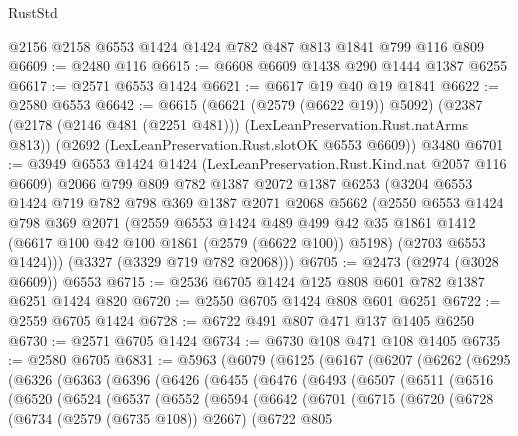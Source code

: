 \begin{lexlean}{RustStd}
\begin{coremodule}
{\begin{coremodule}
{{{{{{{{{{    @2156
    @2158
    @6553
    @1424
    @1424
    @782
    @487
    @813
    @1841
    @799
    @116
    @809
@6609 := @2480 @116
@6615 := @6608 @6609 @1438 @290 @1444 @1387 @6255
@6617 := @2571 @6553 @1424
@6621 := @6617 @19 @40 @19 @1841
@6622 := @2580 @6553
@6642 := @6615
    (@6621 (@2579 (@6622 @19)) @5092)
    (@2387 (@2178 (@2146 @481 (@2251 @481))) (LexLeanPreservation.Rust.natArms @813))
    (@2692 (LexLeanPreservation.Rust.slotOK @6553 @6609))
    @3480
@6701 := @3949
    @6553
    @1424
    @1424
    (LexLeanPreservation.Rust.Kind.nat @2057 @116 @6609)
    @2066
    @799
    @809
    @782
    @1387
    @2072
    @1387
    @6253
    (@3204
      @6553
      @1424
      @719
      @782
      @798
      @369
      @1387
      @2071
      @2068
      @5662
      (@2550
        @6553
        @1424
        @798
        @369
        @2071
        (@2559
          @6553
          @1424
          @489
          @499
          @42
          @35
          @1861
          @1412
          (@6617 @100 @42 @100 @1861 (@2579 (@6622 @100)) @5198)
          (@2703 @6553 @1424)))
      (@3327 (@3329 @719 @782 @2068)))
@6705 := @2473 (@2974 (@3028 @6609)) @6553
@6715 := @2536 @6705 @1424 @125 @808 @601 @782 @1387 @6251 @1424 @820
@6720 := @2550 @6705 @1424 @808 @601 @6251
@6722 := @2559 @6705 @1424
@6728 := @6722 @491 @807 @471 @137 @1405 @6250
@6730 := @2571 @6705 @1424
@6734 := @6730 @108 @471 @108 @1405
@6735 := @2580 @6705
@6831 := @5963
    (@6079
      (@6125
        (@6167
          (@6207
            (@6262
              (@6295
                (@6326
                  (@6363
                    (@6396
                      (@6426
                        (@6455
                          (@6476
                            (@6493
                              (@6507
                                (@6511
                                  (@6516
                                    (@6520
                                      (@6524
                                        (@6537
                                          (@6552
                                            (@6594
                                              (@6642
                                                (@6701
                                                  (@6715
                                                    (@6720
                                                      (@6728
                                                        (@6734 (@2579 (@6735 @108)) @2667)
                                                        (@6722
                                                          @805
}}}}}}}}}}
\end{coremodule}}
\end{coremodule}
\end{lexlean}
